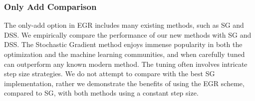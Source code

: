 \documentclass[11pt]{article}
\begin{document}
   \subsubsection{Only Add Comparison}
   
   The only-add option in EGR includes many existing methods, such as SG and DSS. We empirically compare the performance of our new methods with SG and DSS.
   The Stochastic Gradient method enjoys immense popularity in both the optimization and the machine learning communities, and when carefully tuned can outperform any known modern method. The tuning often involves intricate step size strategies. We do not attempt to compare with the best SG implementation, rather we demonstrate the benefits of using the EGR scheme, compared to SG, with both methods using a constant step size. 
   
   
   
\end{document}
